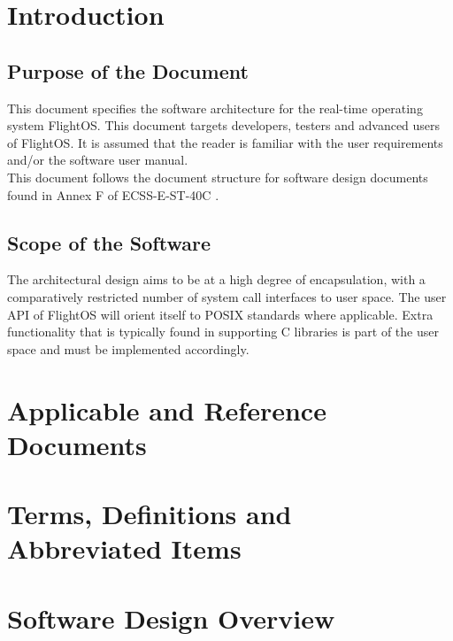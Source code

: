 \chapter{Introduction}

\section{Purpose of the Document}

This document specifies the software architecture for the real-time operating system
FlightOS. This document targets developers, testers and advanced users of
FlightOS. It is assumed that the reader is familiar with the user requirements
and/or the software user manual. \\


\noindent
This document follows the document structure for software design documents 
found in Annex F of ECSS-E-ST-40C \cite{ECSS40C}.


\section{Scope of the Software}

The architectural design aims to be at a high degree of encapsulation, with a
comparatively restricted number of system call interfaces to user space.
The user \gls{API} of FlightOS will orient itself to \gls{POSIX} standards where
applicable. Extra functionality that is typically found in supporting
C libraries is part of the user space and must be implemented accordingly.



\chapter{Applicable and Reference Documents} %

\printbibliography[heading=none]


\chapter{Terms, Definitions and Abbreviated Items}

\printglossary[type=acronym]
\printglossary[type=main, style=altlist]


\chapter{Software Design Overview}




